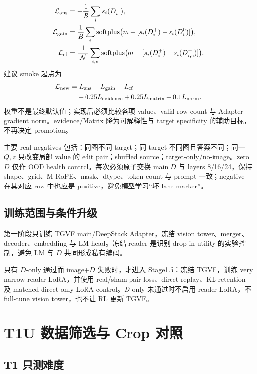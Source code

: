 \documentclass[UTF8,twocolumn,10pt,a4paper]{ctexart}
\newcommand{\Dpos}{D^{+}}
\newcommand{\Dzero}{D^{0}}
\newcommand{\Dwrong}{D^{-}}
\newcommand{\softplus}{\operatorname{softplus}}
\begin{document}
\begin{align}
 \mathcal L_{\rm ans}&=-\frac1B\sum_i s_i(\Dpos_i),\\
 \mathcal L_{\rm gain}&=\frac1B\sum_i\softplus
 \bigl(m-[s_i(\Dpos_i)-s_i(\Dzero_i)]\bigr),\\
 \mathcal L_{\rm cf}&=\frac1{|\mathcal N|}\sum_{i,c}\softplus
 \bigl(m-[s_i(\Dpos_i)-s_i(\Dwrong_{i,c})]\bigr).
 \label{eq:utility-losses}
\end{align}
建议 smoke 起点为
\begin{equation}
\begin{aligned}
 \mathcal L_{\rm new}
 &=L_{\rm ans}+L_{\rm gain}+L_{\rm cf}\\
 &\quad+0.25L_{\rm evidence}+0.25L_{\rm matrix}
 +0.1L_{\rm norm}.
\end{aligned}
 \label{eq:new-loss}
\end{equation}
权重不是最终默认值；实现后必须比较各项 value、valid-row count 与 Adapter gradient norm。evidence/Matrix 降为可解释性与 target specificity 的辅助目标，不再决定 promotion。

主要 real negatives 包括：同图不同 target；同 target 不同图且答案不同；同一 $Q,z$ 只改变局部 value 的 edit pair；shuffled source；target-only/no-image。zero $D$ 仅作 OOD health control。每次必须原子交换 main $D$ 与 layers 8/16/24，保持 shape、grid、M-RoPE、mask、dtype、token count 与 prompt 一致；negative 在其对应 row 中也应是 positive，避免模型学习“坏 lane marker”。

\subsection{训练范围与条件升级}

第一阶段只训练 TGVF main/DeepStack Adapter，冻结 vision tower、merger、decoder、embedding 与 LM head。冻结 reader 是识别 drop-in utility 的实验控制，避免 LM 与 $D$ 共同形成私有编码。

只有 $D$-only 通过而 image+$D$ 失败时，才进入 Stage1.5：冻结 TGVF，训练 very narrow reader-LoRA，并使用 real/sham pair loss、direct replay、KL retention 及 matched direct-only LoRA control。$D$-only 未通过时不启用 reader-LoRA，不 full-tune vision tower，也不让 RL 更新 TGVF。

\section{T1U 数据筛选与 Crop 对照}

\subsection{T1 只测难度}
\end{document}
